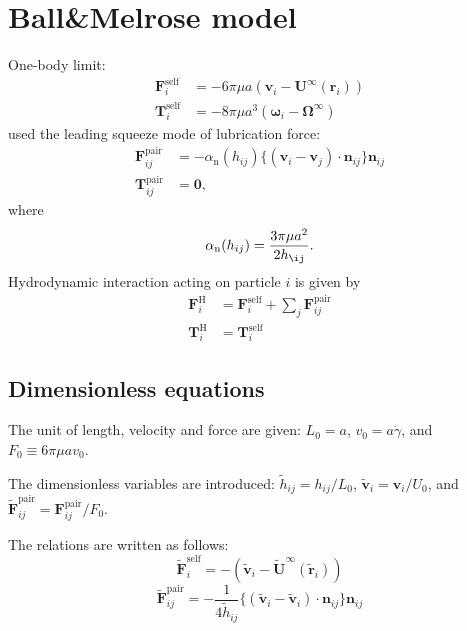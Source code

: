 \documentclass[12pt]{article}
\begin{document}
\section{Ball\&Melrose model}

One-body limit:
\begin{align}
 \bm{F}_i^{\mathrm{self}} &= 
-6 \pi \mu a ( \bm{v}_i - \bm{U}^{\infty} (\bm{r}_i) ) \\
 \bm{T}_i^{\mathrm{self}} &= 
-8 \pi \mu a^3 ( \bm{\omega}_i - \bm{\Omega}^{\infty})
\end{align}
%
\citet{Melrose_2004a} used
the leading squeeze mode of lubrication force:
\begin{align}
 \bm{F}_{ij}^{\mathrm{pair}}
&=
- \alpha_{\mathrm{n}}(h_{ij})
\bigl\{
(\bm{v}_i - \bm{v}_j)
\cdot \bm{n}_{ij}
\bigr\}
\bm{n}_{ij} \\
 \bm{T}_{ij}^{\mathrm{pair}}
&=
\bm{0},
\end{align}
where
\begin{equation}
 \alpha_{\mathrm{n}}(h_{ij}) = 
\frac{3 \pi \mu a^2}{2 h_{\ij}}.
\end{equation}
Hydrodynamic interaction acting on particle $i$
is given by
\begin{align}
\bm{F}_i^{\mathrm{H}}
&=
\bm{F}_i^{\mathrm{self}}
+
\sum_j
\bm{F}_{ij}^{\mathrm{pair}} \\
\bm{T}_i^{\mathrm{H}}
&=
\bm{T}_i^{\mathrm{self}}
\end{align}


\subsection*{Dimensionless equations}

The unit of length, velocity and force 
are given:
$L_0 = a$,  $v_0 = a \dot{\gamma}$, and $F_0 \equiv 6 \pi \mu a v_0$.

The dimensionless variables are introduced:
$\tilde{h}_{ij} = h_{ij} / L_0$,
$\tilde{\bm{v}}_i = \bm{v}_i / U_0$,
and $\tilde{\bm{F}}_{ij}^{\mathrm{pair}} = \bm{F}_{ij}^{\mathrm{pair}} / F_0$.

The relations are written as follows:
\begin{equation}
 \tilde{\bm{F}}_i^{\mathrm{self}} = 
-( \tilde{\bm{v}}_i - 
\tilde{\bm{U}}^{\infty} 
(\tilde{\bm{r}}_i) )
\end{equation}
\begin{equation}
 \tilde{\bm{F}}_{ij}^{\mathrm{pair}}
= 
- \frac{1}{4 \tilde{h}_{ij}}
\bigl\{
(\tilde{\bm{v}}_i-
\tilde{\bm{v}}_i)\cdot
\bm{n}_{ij}
\bigr\}\bm{n}_{ij}
\end{equation}
\end{document}
